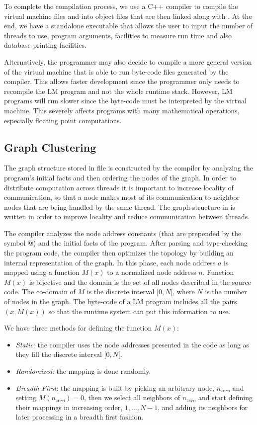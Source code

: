 To complete the compilation process, we use a C++ compiler to compile the
virtual machine files and  into object files that are then linked
along with . At the end, we have a standalone executable that
allows the user to input the number of threads to use, program arguments,
facilities to measure run time and also database printing facilities.

Alternatively, the programmer may also decide to compile a more general version
of the virtual machine that is able to run byte-code files generated by the
compiler. This allows faster development since the programmer only needs to
recompile the LM program and not the whole runtime stack. However, LM programs
will run slower since the byte-code must be interpreted by the virtual machine.
This severely affects programs with many mathematical operations, especially
floating point computations.

\iffalse
\subsection{Graph Clustering}

The graph structure stored in file  is constructed by the
compiler by analyzing the program's initial facts and then ordering the nodes of
the graph.  In order to distribute computation across threads it is important to
increase locality of communication, so that a node makes most of its
communication to neighbor nodes that are being handled by the same thread. The
graph structure in  is written in order to improve locality and
reduce communication between threads.

The compiler analyzes the node address constants (that are prepended by the
symbol @) and the initial facts of the program. After parsing and type-checking the
program code, the compiler then optimizes the topology by building an internal
representation of the graph.  In this phase, each node address $a$ is mapped
using a function $M(x)$ to a normalized node address $n$. Function $M(x)$ is
bijective and the domain is the set of all nodes described in the source code.
The co-domain of $M$ is the discrete interval $[0, N[$, where $N$ is the number
of nodes in the graph. The byte-code of a LM program includes all the pairs $(x,
M(x))$ so that the runtime system can put this information to use.

We have three methods for defining the function $M(x)$:

\begin{itemize}
   \item \emph{Static}: the compiler uses the node addresses presented in the
      code as long as they fill the discrete interval $[0, N[$.
   \item \emph{Randomized}: the mapping is done randomly.
   \item \emph{Breadth-First}: the mapping is built by picking an arbitrary node, $n_{zero}$
   and setting $M(n_{zero}) = 0$, then we select all neighbors of $n_{zero}$ and start defining
   their mappings in increasing order, $1, \dotsc, N-1$, and adding its neighbors for later processing
   in a breadth first fashion.
\end{itemize}

